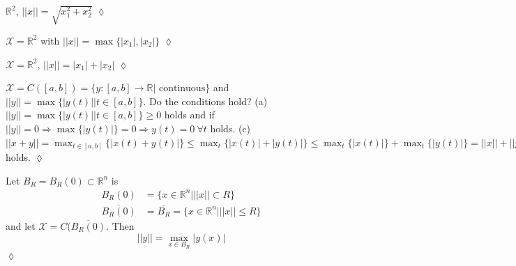 \begin{example}
$\mathbb{R}^2$, $||x||=\sqrt{x_1^2+x_2^2}$
$\lozenge$
\end{example}

\begin{example}
$\mathcal{X}=\mathbb{R}^2$ with $||x|| = \max\{|x_1|,|x_2|\}$
$\lozenge$
\end{example}

\begin{example}
$\mathcal{X} = \mathbb{R}^2$, $||x||=|x_1|+|x_2|$
$\lozenge$
\end{example}

\begin{example}
$\mathcal{X} = C([a,b]) = \{y:[a,b]\to\mathbb{R} | \text{~continuous}\}$ and $||y|| = \max\{|y(t)| | t\in[a,b]\}$.
Do the conditions hold?
\newline
(a) $||y|| = \max\{|y(t)| | t\in[a,b]\}\geq 0$ holds and if $||y||=0 \Rightarrow \max\{|y(t)|\} = 0 \Rightarrow y(t)=0~\forall t$ holds.
\newline
(c) $||x+y|| = \max_{t\in[a,b]}\{|x(t)+y(t)|\} \leq \max_t\{|x(t)|+|y(t)|\} \leq \max_t\{|x(t)|\} + \max_t\{|y(t)|\} = ||x|| + ||y||$ holds.
$\lozenge$
\end{example}

\begin{example}
Let $B_R=B_R(0)\subset\mathbb{R}^n$ is
\begin{align*}
B_R(0) &= \{x\in\mathbb{R}^n | ||x||\subset R\} \\
\overline{B_R(0)} &= \overline{B_R} = \{x\in\mathbb{R}^n | ||x||\leq R\}
\end{align*}
and let $\mathcal{X}=C(\overline{B_R(0)}$.
Then
$$||y||=\max_{x\in B_R} |y(x)|$$
$\lozenge$
\end{example}%
